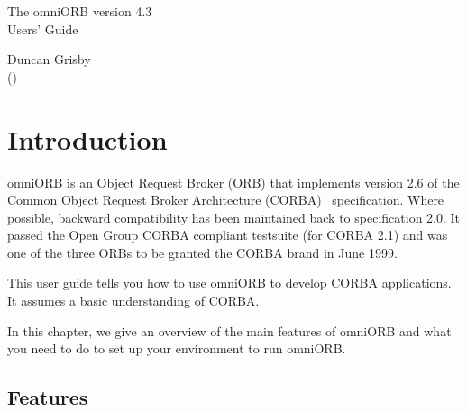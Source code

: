 \documentclass[11pt,oneside,a4paper]{book}
\begin{document}
\pagestyle{empty}

\begin{center}

\vfill

{ \Huge
The omniORB version 4.3\\[4mm]
Users' Guide
}

\vfill

{ \Large
Duncan Grisby\\
{\normalsize (\textit{\href{mailto:dgrisby@apasphere.com}%
                           {}})}%
                           \\[2ex]
}

\vfill

\end{center}

\cleardoublepage

\tableofcontents

\cleardoublepage

\pagestyle{headings}


\mainmatter


\chapter{Introduction}

omniORB is an Object Request Broker (ORB) that implements version 2.6
of the Common Object Request Broker Architecture
(CORBA)~\cite{corba26-spec} specification. Where possible, backward
compatibility has been maintained back to specification 2.0. It passed
the Open Group CORBA compliant testsuite (for CORBA 2.1) and was one
of the three ORBs to be granted the CORBA brand in June 1999.

This user guide tells you how to use omniORB to develop CORBA
applications. It assumes a basic understanding of CORBA.

In this chapter, we give an overview of the main features of omniORB
and what you need to do to set up your environment to run omniORB.

\section{Features}
\end{document}
